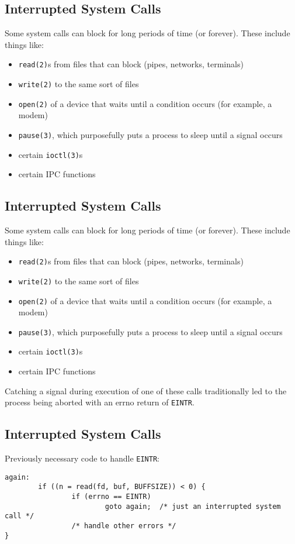 \documentclass[xga]{xdvislides}
\begin{document}
\subsection{Interrupted System Calls}

Some system calls can block for long periods of time (or forever). These
include things like:

\begin{itemize}
	\item {\tt read(2)}s from files that can block (pipes, networks, terminals)
	\item {\tt write(2)} to the same sort of files
	\item {\tt open(2)} of a device that waits until a condition occurs (for example, a modem)
	\item {\tt pause(3)}, which purposefully puts a process to sleep until a signal occurs
	\item certain {\tt ioctl(3)}s
	\item certain IPC functions
\end{itemize}


\subsection{Interrupted System Calls}

Some system calls can block for long periods of time (or forever). These
include things like:

\begin{itemize}
	\item {\tt read(2)}s from files that can block (pipes, networks, terminals)
	\item {\tt write(2)} to the same sort of files
	\item {\tt open(2)} of a device that waits until a condition occurs (for example, a modem)
	\item {\tt pause(3)}, which purposefully puts a process to sleep until a signal occurs
	\item certain {\tt ioctl(3)}s
	\item certain IPC functions
\end{itemize}

Catching a signal during execution of one of these calls traditionally led
to the process being aborted with an errno return of {\tt EINTR}.


\subsection{Interrupted System Calls}
Previously necessary code to handle {\tt EINTR}:
\begin{verbatim}
again:
        if ((n = read(fd, buf, BUFFSIZE)) < 0) {
                if (errno == EINTR)
                        goto again;  /* just an interrupted system call */
                /* handle other errors */
}
\end{verbatim}
\end{document}
